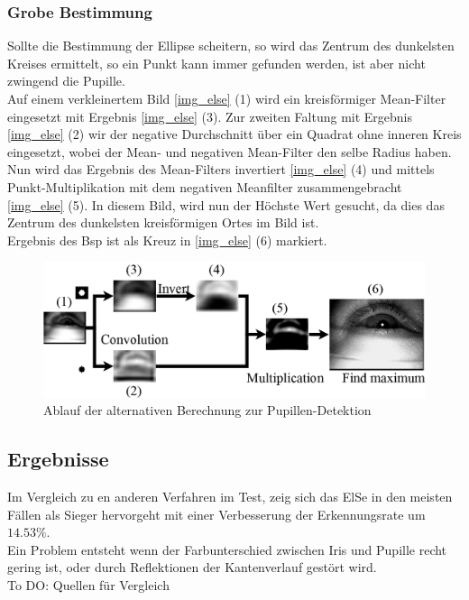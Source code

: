 \subsubsection{Grobe Bestimmung}
Sollte die Bestimmung der Ellipse scheitern, so wird das Zentrum des dunkelsten Kreises ermittelt, so ein Punkt kann immer gefunden werden, ist aber nicht zwingend die Pupille.\\
Auf einem verkleinertem Bild \autoref{img_else} (1) wird ein kreisförmiger Mean-Filter eingesetzt mit Ergebnis \autoref{img_else} (3). Zur zweiten Faltung mit Ergebnis \autoref{img_else} (2) wir der negative Durchschnitt über ein Quadrat ohne inneren Kreis eingesetzt, wobei der Mean- und negativen Mean-Filter den selbe Radius haben.\\
Nun wird das Ergebnis des Mean-Filters invertiert \autoref{img_else} (4) und mittels Punkt-Multiplikation mit dem negativen Meanfilter zusammengebracht \autoref{img_else} (5). In diesem Bild, wird nun der Höchste Wert gesucht, da dies das Zentrum des dunkelsten kreisförmigen Ortes im Bild ist.\\
Ergebnis des Bsp ist als Kreuz in \autoref{img_else} (6) markiert. 
\begin{figure}
	\centering
	\includegraphics[width=0.8\linewidth]{img/ElSe}
	\caption{Ablauf der alternativen Berechnung zur Pupillen-Detektion}
	\label{img_else}
\end{figure}
\subsection{Ergebnisse}
Im Vergleich zu en anderen Verfahren im Test, zeig sich das ElSe in den meisten Fällen als Sieger hervorgeht mit einer Verbesserung der Erkennungsrate um $14.53\%$.\\
Ein Problem entsteht wenn der Farbunterschied zwischen Iris und Pupille recht gering ist, oder durch Reflektionen der Kantenverlauf gestört wird.\\
To DO: Quellen für Vergleich